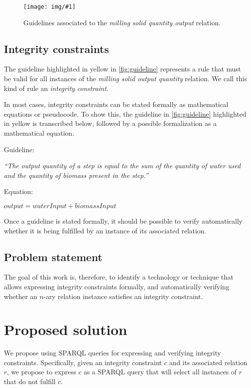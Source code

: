\documentclass[a4paper, 10pt]{article}
\newcommand{\nary}{$n$-ary\xspace}
\newcommand{\img}[3]{
  \begin{figure}[H]
    \centering
    \texttt{[image: img/\#1]}
    \caption{#2}
    \label{#3}
  \end{figure}
}
\begin{document}
\img{guideline.jpg}
    {
      Guidelines associated to the \textit{milling solid quantity output}
      relation.
    }
    {fig:guideline}


\subsection{Integrity constraints}
\label{sec:integrity-constraints}

The guideline highlighted in yellow in \autoref{fig:guideline} represents
a rule that must be valid for all instances of the \textit{milling solid output
quantity} relation. We call this kind of rule an \textit{integrity constraint}.

In most cases, integrity constraints can be stated formally as mathematical
equations or pseudocode. To show this, the guideline in \autoref{fig:guideline}
highlighted in yellow is transcribed below, followed by a possible
formalization as a mathematical equation.

Guideline:

\begin{center}
  \textit{``The output quantity of a step is equal to the sum of the quantity
  of water used and the quantity of biomass present in the step.''}
\end{center}

Equation:

\begin{center}
  $output = waterInput + biomassInput$
\end{center}

Once a guideline is stated formally, it should be possible to verify
automatically whether it is being fulfilled by an instance of its associated
relation.

\subsection{Problem statement}

The goal of this work is, therefore, to identify a technology or technique that
allows expressing integrity constraints formally, and automatically verifying
whether an \nary relation instance satisfies an integrity constraint.


\section{Proposed solution}

We propose using SPARQL queries for expressing and verifying integrity
constraints. Specifically, given an integrity constraint $c$ and its associated
relation $r$, we propose to express $c$ as a SPARQL query that will select all
instances of $r$ that do not fulfill $c$.
\end{document}
